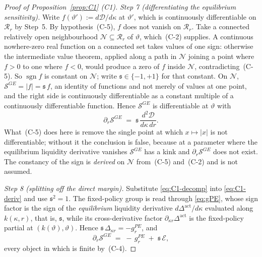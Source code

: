 \documentclass[11pt]{article}
\newcommand{\Dact}{\Delta^{\mathrm{act}}}
\begin{document}
\begin{proof}[Proof of Proposition~\ref{prop:C1} (C1)]
\emph{Step 7 (differentiating the equilibrium sensitivity).} Write $f(\vartheta') :=
d\mathcal D/d\kappa$ at $\vartheta'$, which is continuously differentiable on $\mathcal R_r$ by
Step~5. By hypothesis~(C-5), $f$ does not vanish on $\mathcal R_r$. Take a connected relatively open
neighbourhood $\mathcal N\subseteq\mathcal R_r$ of $\vartheta$, which~(C-2) supplies. A continuous
nowhere-zero real function on a connected set takes values of one sign: otherwise the intermediate
value theorem, applied along a path in $\mathcal N$ joining a point where $f>0$ to one where $f<0$,
would produce a zero of $f$ inside $\mathcal N$, contradicting~(C-5). So
$\operatorname{sgn} f$ is constant on $\mathcal N$; write $\mathfrak s\in\{-1,+1\}$ for that
constant. On $\mathcal N$,
$\mathcal S^{GE} = \lvert f\rvert = \mathfrak s\,f$, an identity of functions and not merely of
values at one point, and the right side is continuously differentiable as a constant multiple of a
continuously differentiable function. Hence $\mathcal S^{GE}$ is differentiable at $\vartheta$ with
\begin{equation}
\label{eq:C1-deriv}
\partial_r\mathcal S^{GE} \;=\; \mathfrak s\,\frac{d^2\mathcal D}{d\kappa\,dr} .
\end{equation}
What~(C-5) does here is remove the single point at which $x\mapsto|x|$ is not differentiable;
without it the conclusion is false, because at a parameter where the equilibrium liquidity
derivative vanishes $\mathcal S^{GE}$ has a kink and $\partial_r\mathcal S^{GE}$ does not exist. The
constancy of the sign is \emph{derived} on $\mathcal N$ from~(C-5) and~(C-2) and is not assumed.

\emph{Step 8 (splitting off the direct margin).} Substitute \eqref{eq:C1-decomp} into
\eqref{eq:C1-deriv} and use $\mathfrak s^2 = 1$. The fixed-policy group is read through
\eqref{eq:gPE}, whose sign factor is the sign of the \emph{equilibrium} liquidity derivative
$d\Dact/d\kappa$ evaluated along $k(\kappa,r)$, that is, $\mathfrak s$, while its
cross-derivative factor $\partial_{\kappa r}\Dact$ is the fixed-policy partial at
$(k(\vartheta),\vartheta)$. Hence $\mathfrak s\,\Delta_{\kappa r} = -g_r^{PE}$, and
\begin{equation}
\label{eq:C1-split}
\partial_r\mathcal S^{GE} \;=\; -\,g_r^{PE} \;+\; \mathfrak s\,\mathcal E ,
\end{equation}
every object in which is finite by~(C-4).


\end{proof}
\end{document}
